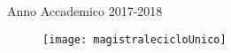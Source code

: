 \documentclass[
12pt, %
english, %
singlespacing, %
headsepline, %
]{MastersDoctoralThesis} %
\begin{document}
\begin{titlepage}
\begin{center}

 


\begin{center}
\large{Anno Accademico 2017-2018}
\end{center}

\begin{figure}[b]
\centering
\texttt{[image: magistralecicloUnico]}
\label{fig:magistralecicloUnico}
\end{figure}
 
\vfill

\end{center}
\end{titlepage}



 
\end{document}
